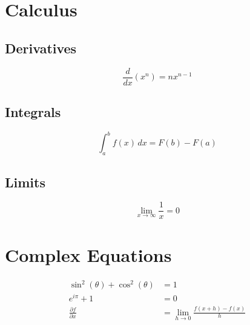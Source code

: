 \documentclass{article}
\begin{document}
\section{Calculus}

\subsection{Derivatives}
\begin{equation}
    \frac{d}{dx}(x^n) = nx^{n-1}
\end{equation}

\subsection{Integrals}
\begin{equation}
    \int_a^b f(x) \, dx = F(b) - F(a)
\end{equation}

\subsection{Limits}
\begin{equation}
    \lim_{x \to \infty} \frac{1}{x} = 0
\end{equation}

\section{Complex Equations}

\begin{align}
    \sin^2(\theta) + \cos^2(\theta) &= 1 \\
    e^{i\pi} + 1 &= 0 \\
    \frac{\partial f}{\partial x} &= \lim_{h \to 0} \frac{f(x+h) - f(x)}{h}
\end{align}
\end{document}
